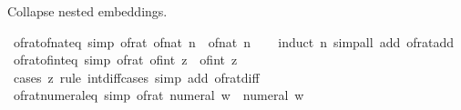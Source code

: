 \begin{isabellebody}
\begin{isamarkuptext}
Collapse nested embeddings.%
\end{isamarkuptext}\isamarkuptrue%
\isamarkupfalse%
\ of{\isacharunderscore}{\kern0pt}rat{\isacharunderscore}{\kern0pt}of{\isacharunderscore}{\kern0pt}nat{\isacharunderscore}{\kern0pt}eq\ {\isacharbrackleft}{\kern0pt}simp{\isacharbrackright}{\kern0pt}{\isacharcolon}{\kern0pt}\ {\isachardoublequoteopen}of{\isacharunderscore}{\kern0pt}rat\ {\isacharparenleft}{\kern0pt}of{\isacharunderscore}{\kern0pt}nat\ n{\isacharparenright}{\kern0pt}\ {\isacharequal}{\kern0pt}\ of{\isacharunderscore}{\kern0pt}nat\ n{\isachardoublequoteclose}\isanewline
%
\isadelimproof
\ \ %
\endisadelimproof
%
\isatagproof
{}\isamarkupfalse%
\ {\isacharparenleft}{\kern0pt}induct\ n{\isacharparenright}{\kern0pt}\ {\isacharparenleft}{\kern0pt}simp{\isacharunderscore}{\kern0pt}all\ add{\isacharcolon}{\kern0pt}\ of{\isacharunderscore}{\kern0pt}rat{\isacharunderscore}{\kern0pt}add{\isacharparenright}{\kern0pt}%
\endisatagproof
{\isafoldproof}%
%
\isadelimproof
\isanewline
%
\endisadelimproof
\isanewline
{}\isamarkupfalse%
\ of{\isacharunderscore}{\kern0pt}rat{\isacharunderscore}{\kern0pt}of{\isacharunderscore}{\kern0pt}int{\isacharunderscore}{\kern0pt}eq\ {\isacharbrackleft}{\kern0pt}simp{\isacharbrackright}{\kern0pt}{\isacharcolon}{\kern0pt}\ {\isachardoublequoteopen}of{\isacharunderscore}{\kern0pt}rat\ {\isacharparenleft}{\kern0pt}of{\isacharunderscore}{\kern0pt}int\ z{\isacharparenright}{\kern0pt}\ {\isacharequal}{\kern0pt}\ of{\isacharunderscore}{\kern0pt}int\ z{\isachardoublequoteclose}\isanewline
%
\isadelimproof
\ \ %
\endisadelimproof
%
\isatagproof
{}\isamarkupfalse%
\ {\isacharparenleft}{\kern0pt}cases\ z\ rule{\isacharcolon}{\kern0pt}\ int{\isacharunderscore}{\kern0pt}diff{\isacharunderscore}{\kern0pt}cases{\isacharparenright}{\kern0pt}\ {\isacharparenleft}{\kern0pt}simp\ add{\isacharcolon}{\kern0pt}\ of{\isacharunderscore}{\kern0pt}rat{\isacharunderscore}{\kern0pt}diff{\isacharparenright}{\kern0pt}%
\endisatagproof
{\isafoldproof}%
%
\isadelimproof
\isanewline
%
\endisadelimproof
\isanewline
{}\isamarkupfalse%
\ of{\isacharunderscore}{\kern0pt}rat{\isacharunderscore}{\kern0pt}numeral{\isacharunderscore}{\kern0pt}eq\ {\isacharbrackleft}{\kern0pt}simp{\isacharbrackright}{\kern0pt}{\isacharcolon}{\kern0pt}\ {\isachardoublequoteopen}of{\isacharunderscore}{\kern0pt}rat\ {\isacharparenleft}{\kern0pt}numeral\ w{\isacharparenright}{\kern0pt}\ {\isacharequal}{\kern0pt}\ numeral\ w{\isachardoublequoteclose}\isanewline
%
\isadelimproof
\ \ %
\endisadelimproof

\end{isabellebody}
